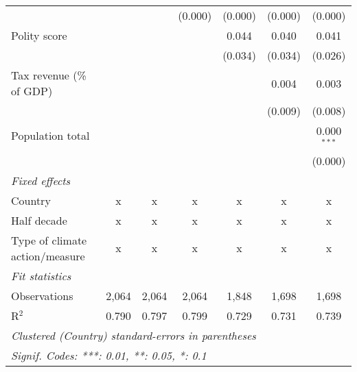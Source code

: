\begin{tabular}{lcccccc}
                                                                           &              &                & (0.000)        & (0.000)        & (0.000)        & (0.000)\\   
   Polity score                                                            &              &                &                & 0.044          & 0.040          & 0.041\\   
                                                                           &              &                &                & (0.034)        & (0.034)        & (0.026)\\   
   Tax revenue (\% of GDP)                                                 &              &                &                &                & 0.004          & 0.003\\   
                                                                           &              &                &                &                & (0.009)        & (0.008)\\   
   Population total                                                        &              &                &                &                &                & 0.000$^{***}$\\   
                                                                           &              &                &                &                &                & (0.000)\\   
   \emph{Fixed effects}\\
   Country                                                                 & x            & x              & x              & x              & x              & x\\  
   Half decade                                                             & x            & x              & x              & x              & x              & x\\  
   Type of climate action/measure                                          & x            & x              & x              & x              & x              & x\\  
   \midrule \emph{Fit statistics}\\
   Observations                                                            & 2,064        & 2,064          & 2,064          & 1,848          & 1,698          & 1,698\\  
   R$^2$                                                                   & 0.790        & 0.797          & 0.799          & 0.729          & 0.731          & 0.739\\  
   \midrule
   \multicolumn{7}{l}{\emph{Clustered (Country) standard-errors in parentheses}}\\
   \multicolumn{7}{l}{\emph{Signif. Codes: ***: 0.01, **: 0.05, *: 0.1}}\\
\end{tabular}
\par\endgroup


